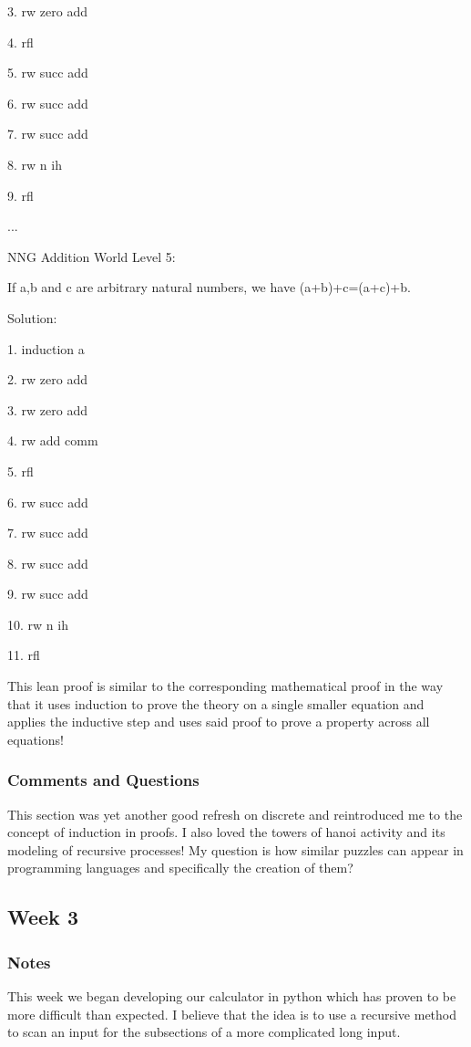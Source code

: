 \documentclass{article}
\theoremstyle{theorem}
\theoremstyle{definition}
\theoremstyle{remark}
\begin{document}
3. rw zero add

4. rfl

5. rw succ add

6. rw succ add

7. rw succ add

8. rw n ih

9. rfl

...

NNG Addition World Level 5:

If a,b and c are arbitrary natural numbers, we have (a+b)+c=(a+c)+b.

Solution: 

1. induction a

2. rw zero add

3. rw zero add

4. rw add comm

5. rfl

6. rw succ add

7. rw succ add

8. rw succ add

9. rw succ add

10. rw n ih

11. rfl

This lean proof is similar to the corresponding mathematical proof in the way that it uses induction to prove the theory on a single smaller equation and applies the inductive step and uses said proof to prove a property across all equations!

\subsubsection*{Comments and Questions}

This section was yet another good refresh on discrete and reintroduced me to the concept of induction in proofs. I also loved the towers of hanoi activity and its modeling of recursive processes! My question is how similar puzzles can appear in programming languages and specifically the creation of them?




\subsection{Week 3}



\subsubsection*{Notes}
This week we began developing our calculator in python which has proven to be more difficult than expected. I believe that the idea is to use a recursive method to scan an input for the subsections of a more complicated long input.
\end{document}
